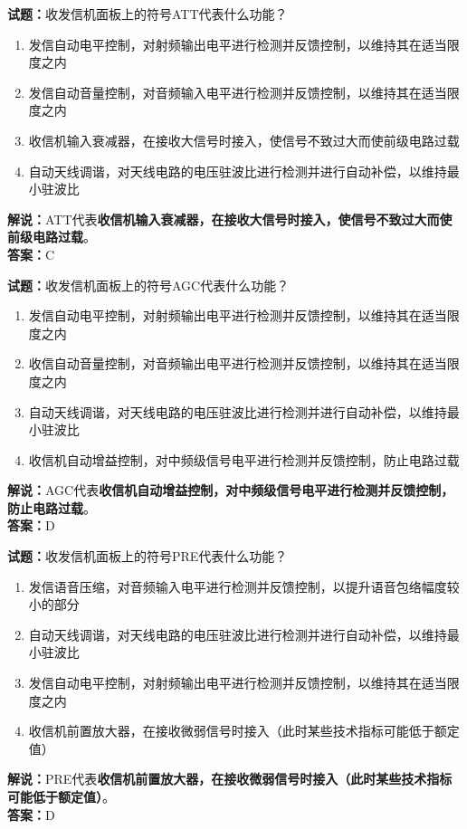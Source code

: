 \documentclass{ctexbook}
\begin{document}
\bigskip


\noindent\textbf{试题：}收发信机面板上的符号ATT代表什么功能？
\begin{enumerate}[leftmargin=3em]
\item 发信自动电平控制，对射频输出电平进行检测并反馈控制，以维持其在适当限度之内
\item 发信自动音量控制，对音频输入电平进行检测并反馈控制，以维持其在适当限度之内
\item 收信机输入衰减器，在接收大信号时接入，使信号不致过大而使前级电路过载
\item 自动天线调谐，对天线电路的电压驻波比进行检测并进行自动补偿，以维持最小驻波比
\end{enumerate}
\noindent\textbf{解说：}ATT代表\textbf{收信机输入衰减器，在接收大信号时接入，使信号不致过大而使前级电路过载}。\\\noindent\textbf{答案：}C




\bigskip


\noindent\textbf{试题：}收发信机面板上的符号AGC代表什么功能？
\begin{enumerate}[leftmargin=3em]
\item 发信自动电平控制，对射频输出电平进行检测并反馈控制，以维持其在适当限度之内
\item 收信自动音量控制，对音频输出电平进行检测并反馈控制，以维持其在适当限度之内
\item 自动天线调谐，对天线电路的电压驻波比进行检测并进行自动补偿，以维持最小驻波比
\item 收信机自动增益控制，对中频级信号电平进行检测并反馈控制，防止电路过载
\end{enumerate}
\noindent\textbf{解说：}AGC代表\textbf{收信机自动增益控制，对中频级信号电平进行检测并反馈控制，防止电路过载}。\\\noindent\textbf{答案：}D



\bigskip


\noindent\textbf{试题：}收发信机面板上的符号PRE代表什么功能？
\begin{enumerate}[leftmargin=3em]
\item 发信语音压缩，对音频输入电平进行检测并反馈控制，以提升语音包络幅度较小的部分
\item 自动天线调谐，对天线电路的电压驻波比进行检测并进行自动补偿，以维持最小驻波比
\item 发信自动电平控制，对射频输出电平进行检测并反馈控制，以维持其在适当限度之内
\item 收信机前置放大器，在接收微弱信号时接入（此时某些技术指标可能低于额定值）
\end{enumerate}
\noindent\textbf{解说：}PRE代表\textbf{收信机前置放大器，在接收微弱信号时接入（此时某些技术指标可能低于额定值）}。\\\noindent\textbf{答案：}D
\end{document}
